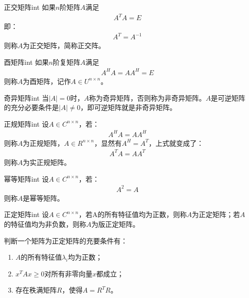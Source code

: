 \begin{definition}{\hypertarget{orthogonal}{正交矩阵}}{int}
\label{def:orthogonal}
如果$n$阶矩阵$A$满足
\begin{align}
A^{T}A=E
\end{align}
即：
\begin{align}
A^{T}=A^{-1}
\end{align}
则称$A$为正交矩阵，简称正交阵。
\end{definition}

\begin{definition}{\hypertarget{unitary}{酉矩阵}}{int}
\label{def:unitary}
如果$n$阶复矩阵$A$满足
\begin{align}
A^{H}A=AA^{H}=E
\end{align}
则称$A$为酉矩阵，记作$A\in{U^{n\times{n}}}$。
\end{definition}

\begin{definition}{\hypertarget{singular}{奇异矩阵}}{int}
\label{def:singular}
当$|A|=0$时，$A$称为奇异矩阵，否则称为非奇异矩阵。$A$是可逆矩阵的充分必要条件是$|A|\neq{0}$，即可逆矩阵就是非奇异矩阵。
\end{definition}

\begin{definition}{\hypertarget{formal}{正规矩阵}}{int}
\label{def:formal}
设$A\in{C^{n\times{n}}}$，若：
\begin{align}
A^{H}A=AA^{H}
\end{align}
则称$A$为正规矩阵，$A\in{R^{n\times{n}}}$，显然有$A^{H}=A^{T}$，上式就变成了：
\begin{align}
A^{T}A=AA^{T}
\end{align}
则称$A$为实正规矩阵。
\end{definition}

\begin{definition}{\hypertarget{power}{幂等矩阵}}{int}
\label{def:power}
设$A\in{C^{n\times{n}}}$，若：
\begin{align}
A^{2}=A
\end{align}
则称$A$是幂等矩阵。
\end{definition}

\begin{definition}{\hypertarget{positive}{正定矩阵}}{int}
\label{def:positive}
设$A\in{C^{n\times{n}}}$，若A的所有特征值均为正数，则称$A$为正定矩阵；若$A$的特征值均为非负数，则称$A$为版正定矩阵。

判断一个矩阵为正定矩阵的充要条件有：
\begin{enumerate}
\item $A$的所有特征值$\lambda_{i}$均为正数；
\item $x^{T}Ax \ge 0$对所有非零向量$x$都成立；
\item 存在秩满矩阵$R$，使得$A=R^{T}R$。
\end{enumerate}
\end{definition}

